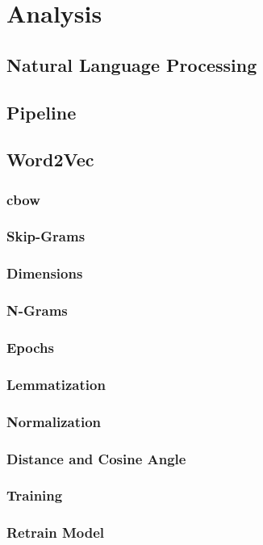 \chapter{Analysis}
\label{chap:analysis}
\section{Natural Language Processing}
\section{Pipeline}
\section{Word2Vec}
\subsection{\gls{cbow}}
\label{sec:cbow}
\subsection{Skip-Grams}
\label{sec:skip-grams}
\subsection{Dimensions}
\subsection{N-Grams}
\subsection{Epochs}
\subsection{Lemmatization}
\subsection{Normalization}
\subsection{Distance and Cosine Angle}
\subsection{Training}
\subsection{Retrain Model}
